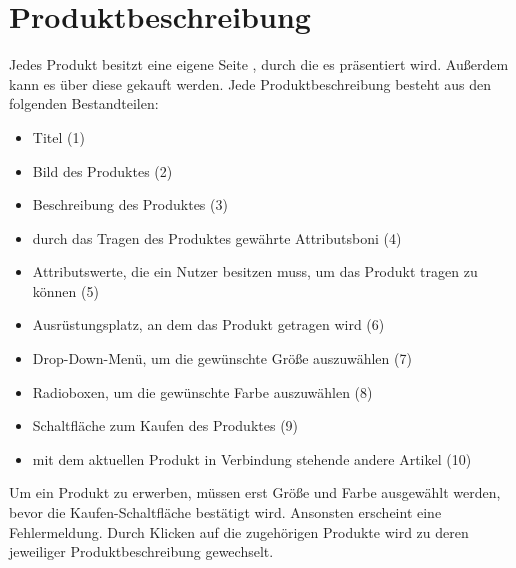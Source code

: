 \newpage

\section{Produktbeschreibung}
\label{chp:Produktbeschreibung}
Jedes Produkt besitzt eine eigene Seite , durch die es präsentiert wird. Außerdem kann es über diese gekauft werden. Jede Produktbeschreibung besteht aus den folgenden Bestandteilen:
\begin{itemize}
  \item Titel (1)
  \vspace*{-0.5em}
  \item Bild des Produktes (2)
  \vspace*{-0.5em}
  \item Beschreibung des Produktes (3)
  \vspace*{-0.5em}
  \item durch das Tragen des Produktes gewährte Attributsboni  (4)
  \vspace*{-0.5em}
  \item Attributswerte, die ein Nutzer besitzen muss, um das Produkt tragen zu können (5)
  \vspace*{-0.5em}
  \item Ausrüstungsplatz, an dem das Produkt getragen wird (6)
  \vspace*{-0.5em}
  \item Drop-Down-Menü, um die gewünschte Größe auszuwählen (7)
  \vspace*{-0.5em}
  \item Radioboxen, um die gewünschte Farbe auszuwählen (8)
  \vspace*{-0.5em}
  \item Schaltfläche zum Kaufen des Produktes (9)
  \vspace*{-0.5em}
  \item mit dem aktuellen Produkt in Verbindung stehende andere Artikel (10)
\end{itemize}
Um ein Produkt zu erwerben, müssen erst Größe und Farbe ausgewählt werden, bevor die Kaufen-Schaltfläche bestätigt wird. Ansonsten erscheint eine Fehlermeldung. Durch Klicken auf die zugehörigen Produkte wird zu deren jeweiliger Produktbeschreibung gewechselt.

